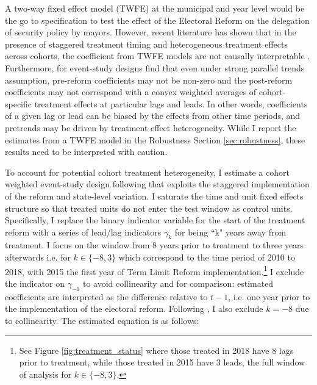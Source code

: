 \documentclass[12pt]{amsart}
\numberwithin{equation}{section}
\theoremstyle{definition}
\theoremstyle{definition}
\theoremstyle{definition}
\begin{document}
A two-way fixed effect model (TWFE) at the municipal and year level would be the go to specification to test the effect of the Electoral Reform on the delegation of security policy by mayors. However, recent literature has shown that in the presence of staggered treatment timing and heterogeneous treatment effects across cohorts, the coefficient from TWFE models are not causally interpretable \citep{goodman_bacon_2018, callaway_santana_2019, strezhnev_2018, chaisemarting_etal_2019}. Furthermore, for event-study designs \citet{abraham_sun_2020} find that even under strong parallel trends assumption, pre-reform coefficients may not be non-zero and the post-reform coefficients may not correspond with a convex weighted averages of cohort-specific treatment effects at particular lags and leads. In other words, coefficients of a given lag or lead can be biased by the effects from other time periods, and pretrends may be driven by treatment effect heterogeneity. While I report the estimates from a TWFE model in the Robustness Section \ref{sec:robustness}, these results need to be interpreted with caution.
   
 To account for potential cohort treatment heterogeneity, I estimate  a cohort weighted event-study design following \citet{abraham_sun_2020} that exploits the staggered implementation of the reform and state-level variation. 
 I saturate the time and unit fixed effects structure so that treated units do not enter the test window as control units. Specifically, I replace the binary indicator variable for the start of the treatment reform with a series of lead/lag indicators $\gamma_k$ for being ``k" years away from treatment. I focus on the window from 8 years prior to treatment to three years afterwards i.e. for $k \in \{-8,3\} $ which correspond to the time period of 2010 to 2018, with 2015 the first year of Term Limit Reform implementation.\footnote{See Figure \ref{fig:treatment_status} where those treated in 2018 have 8 lags prior to treatment, while those treated in 2015 have 3 leads, the full window of analysis for $k \in \{-8,3\} $.} %
I exclude the indicator on $\gamma_{-1}$ to avoid collinearity and for comparison: estimated coefficients are interpreted as the difference relative to $t-1$, i.e. one year prior to the implementation of the electoral reform. Following   \citet{abraham_sun_2020}, I also exclude $k=-8$ due to collinearity. The estimated equation is as follows:
\end{document}
